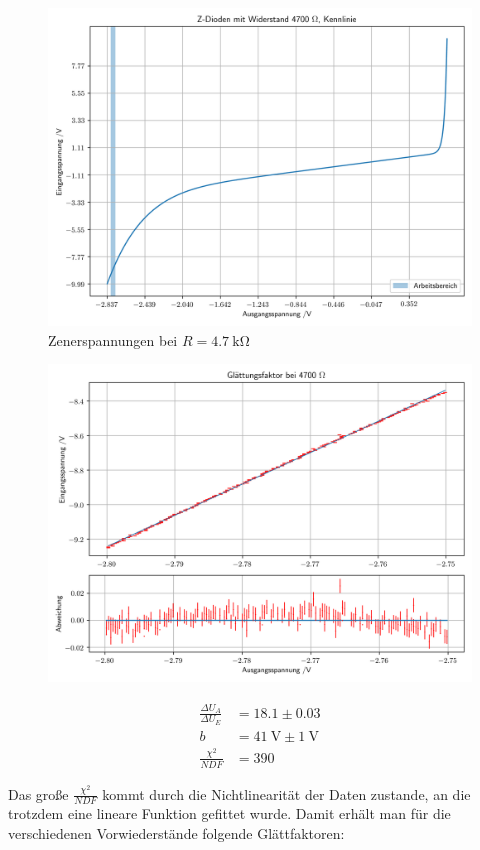 \documentclass[12pt,twoside,a4paper]{scrartcl}
\begin{document}
				\begin{figure}
					\includegraphics[width = \textwidth]{Plots/zener/spannungenZener_4700}
					\caption{Zenerspannungen bei $R = \SI{4.7}{\kilo \ohm} $}
				\end{figure}

				\begin{figure}[H]
					\begin{minipage}{0.69 \textwidth}
						\includegraphics[width = \textwidth]{Plots/zener/diff_res_4700}
					\end{minipage}
					\begin{minipage}{0.29 \textwidth}
						\begin{align*}
							\frac{\Delta U_A}{\Delta U_E} &= 18.1 \pm 0.03 \\
							b &= \SI{41}{ \volt } \pm \SI{1}{\volt} \\
							\frac{\chi^2}{NDF} &= 390
						\end{align*}
					\end{minipage}
				\end{figure}
				Das große $\frac{\chi^2}{NDF}$ kommt durch die Nichtlinearität der Daten zustande, an die trotzdem eine lineare Funktion gefittet wurde.
				Damit erhält man für die verschiedenen Vorwiederstände folgende Glättfaktoren:
\end{document}
